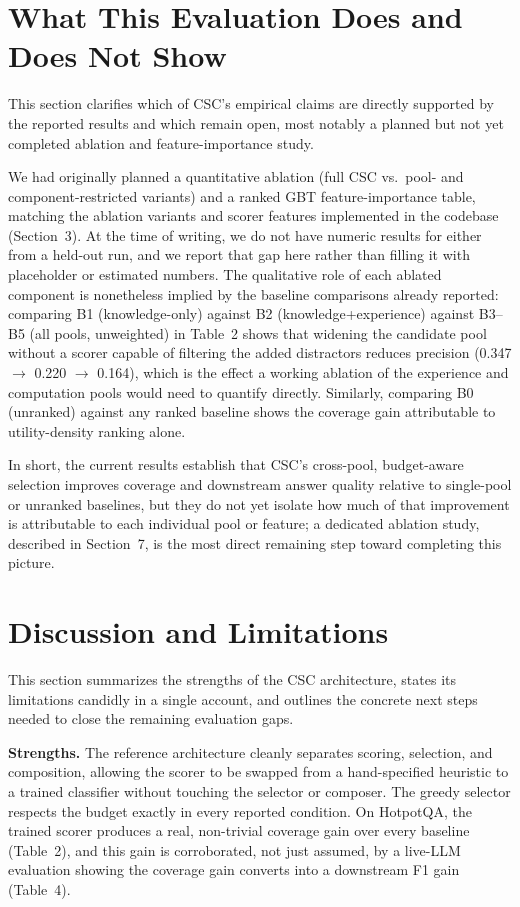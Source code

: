 \documentclass{article}
\begin{document}
\section{What This Evaluation Does and Does Not Show}

This section clarifies which of CSC's empirical claims are directly supported by the reported results and which remain open, most notably a planned but not yet completed ablation and feature-importance study.

We had originally planned a quantitative ablation (full CSC vs.\ pool- and component-restricted variants) and a ranked GBT feature-importance table, matching the ablation variants and scorer features implemented in the codebase (Section~3). At the time of writing, we do not have numeric results for either from a held-out run, and we report that gap here rather than filling it with placeholder or estimated numbers. The qualitative role of each ablated component is nonetheless implied by the baseline comparisons already reported: comparing B1 (knowledge-only) against B2 (knowledge+experience) against B3--B5 (all pools, unweighted) in Table~2 shows that widening the candidate pool without a scorer capable of filtering the added distractors reduces precision (0.347 $\rightarrow$ 0.220 $\rightarrow$ 0.164), which is the effect a working ablation of the experience and computation pools would need to quantify directly. Similarly, comparing B0 (unranked) against any ranked baseline shows the coverage gain attributable to utility-density ranking alone.

In short, the current results establish that CSC's cross-pool, budget-aware selection improves coverage and downstream answer quality relative to single-pool or unranked baselines, but they do not yet isolate how much of that improvement is attributable to each individual pool or feature; a dedicated ablation study, described in Section~7, is the most direct remaining step toward completing this picture.

\section{Discussion and Limitations}

This section summarizes the strengths of the CSC architecture, states its limitations candidly in a single account, and outlines the concrete next steps needed to close the remaining evaluation gaps.

\textbf{Strengths.} The reference architecture cleanly separates scoring, selection, and composition, allowing the scorer to be swapped from a hand-specified heuristic to a trained classifier without touching the selector or composer. The greedy selector respects the budget exactly in every reported condition. On HotpotQA, the trained scorer produces a real, non-trivial coverage gain over every baseline (Table~2), and this gain is corroborated, not just assumed, by a live-LLM evaluation showing the coverage gain converts into a downstream F1 gain (Table~4).
\end{document}
